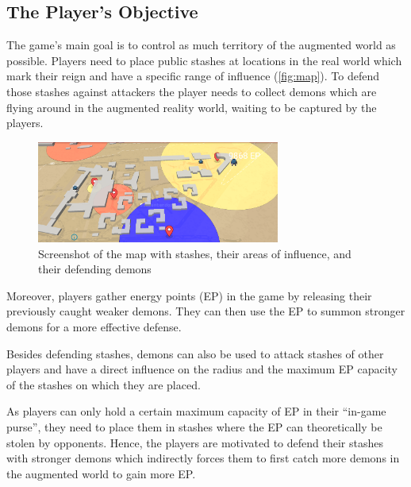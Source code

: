\subsection{The Player's Objective}

The game's main goal is to control as much territory of the augmented world as possible.
Players need to place public stashes at locations in the real world which mark their reign and have a specific range of influence (\autoref{fig:map}). 
To defend those stashes against attackers the player needs to collect demons which are flying around in the augmented reality world, waiting to be captured by the players. 

\begin{figure}
    \centering
    \includegraphics[width=8cm]{graphics/map.png}
    \caption{Screenshot of the map with stashes, their areas of influence, and their defending demons}
    \label{fig:map}
\end{figure}


Moreover, players gather energy points (EP) in the game by releasing their previously caught weaker demons. They can then use the EP to summon stronger demons for a more effective defense.

Besides defending stashes, demons can also be used to attack stashes of other players and have a direct influence on the radius and the maximum EP capacity of the stashes on which they are placed.

As players can only hold a certain maximum capacity of EP in their \enquote{in-game purse}, they need to place them in stashes where the EP can theoretically be stolen by opponents. 
Hence, the players are motivated to defend their stashes with stronger demons which indirectly forces them to first catch more demons in the augmented world to gain more EP.




